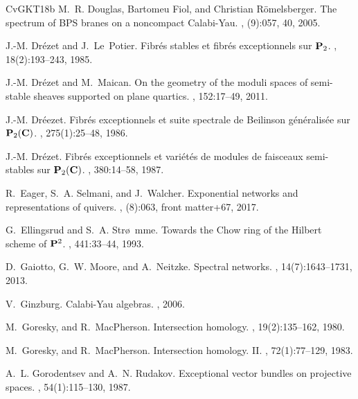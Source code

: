 \documentclass[12pt, a4paper]{amsart}
\begin{document}
\begin{thebibliography}{CvGKT18b}
M.~R. Douglas, Bartomeu Fiol, and Christian R\"{o}melsberger.
\newblock The spectrum of {BPS} branes on a noncompact {C}alabi-{Y}au.
, (9):057, 40, 2005.

J.-M. Dr\'{e}zet and J.~Le~Potier.
\newblock Fibr\'{e}s stables et fibr\'{e}s exceptionnels sur {${\bf P}_2$}.
, 18(2):193--243, 1985.

J.-M. Dr\'{e}zet and M.~Maican.
\newblock On the geometry of the moduli spaces of semi-stable sheaves supported
  on plane quartics.
, 152:17--49, 2011.

J.-M. Dr\'{e}ezet.
\newblock Fibr\'{e}s exceptionnels et suite spectrale de {B}eilinson
  g\'{e}n\'{e}ralis\'{e}e sur {${\bf P}_2({\bf C})$}.
, 275(1):25--48, 1986.

J.-M. Dr\'{e}zet.
\newblock Fibr\'{e}s exceptionnels et vari\'{e}t\'{e}s de modules de faisceaux
  semi-stables sur {${\bf P}_2({\bf C})$}.
, 380:14--58, 1987.

R.~Eager, S.~A. Selmani, and J.~Walcher.
\newblock Exponential networks and representations of quivers.
, (8):063, front matter+67, 2017.

G.~Ellingsrud and S.~A. Str\o~mme.
\newblock Towards the {C}how ring of the {H}ilbert scheme of {${\bf P}^2$}.
, 441:33--44, 1993.



D.~Gaiotto, G.~W. Moore, and A.~Neitzke.
\newblock Spectral networks.
, 14(7):1643--1731, 2013.

V.~Ginzburg.
\newblock Calabi-{Y}au algebras.
, 2006.


 M.~Goresky, and R.~MacPherson.
\newblock Intersection homology.
, 19(2):135--162, 1980.

M.~Goresky, and R.~MacPherson.
\newblock Intersection homology. {II}.
,
72(1):77--129, 1983.


A.~L. Gorodentsev and A.~N. Rudakov.
\newblock Exceptional vector bundles on projective spaces.
, 54(1):115--130, 1987.




\end{thebibliography}
\end{document}
